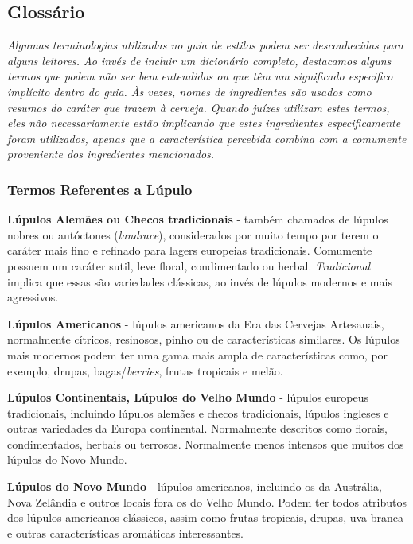\subsection*{Glossário}
\textit{Algumas terminologias utilizadas no guia de estilos podem ser desconhecidas para alguns leitores. Ao invés de incluir um dicionário completo, destacamos alguns termos que podem não ser bem entendidos ou que têm um significado especifico implícito dentro do guia. Às vezes, nomes de ingredientes são usados como resumos do caráter que trazem à cerveja. Quando juízes utilizam estes termos, eles não necessariamente estão implicando que estes ingredientes especificamente foram utilizados, apenas que a característica percebida combina com a comumente proveniente dos ingredientes mencionados.}
\subsubsection*{Termos Referentes a Lúpulo}
\textbf{Lúpulos Alemães ou Checos tradicionais} - também chamados de lúpulos nobres ou autóctones (\textit{landrace}), considerados por muito tempo por terem o caráter mais fino e refinado para lagers europeias tradicionais. Comumente possuem um caráter sutil, leve floral, condimentado ou herbal. \textit{Tradicional} implica que essas são variedades clássicas, ao invés de lúpulos modernos e mais agressivos.

\textbf{Lúpulos Americanos} - lúpulos americanos da Era das Cervejas Artesanais, normalmente cítricos, resinosos, pinho ou de características similares. Os lúpulos mais modernos podem ter uma gama mais ampla de características como, por exemplo, drupas, bagas/\textit{berries}, frutas tropicais e melão.

\textbf{Lúpulos Continentais, Lúpulos do Velho Mundo} - lúpulos europeus tradicionais, incluindo lúpulos alemães e checos tradicionais, lúpulos ingleses e outras variedades da Europa continental. Normalmente descritos como florais, condimentados, herbais ou terrosos. Normalmente menos intensos que muitos dos lúpulos do Novo Mundo.

\textbf{Lúpulos do Novo Mundo} - lúpulos americanos, incluindo os da Austrália, Nova Zelândia e outros locais fora os do Velho Mundo. Podem ter todos atributos dos lúpulos americanos clássicos, assim como frutas tropicais, drupas, uva branca e outras características aromáticas interessantes.

